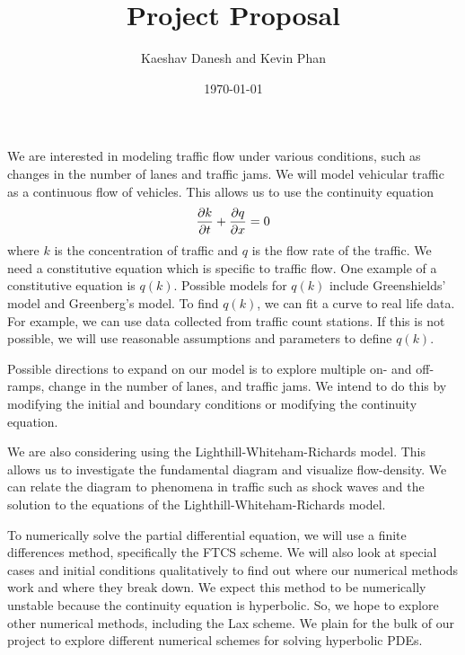 \documentclass[12pt]{article}
\title{Project Proposal}
\author{Kaeshav Danesh and Kevin Phan}
\date{\today}
\begin{document}
	
	\maketitle
    We are interested in modeling traffic flow under various conditions, such as changes in the number of lanes and traffic jams. We will model vehicular traffic as a continuous flow of vehicles. This allows us to use the continuity equation 
    \begin{equation}
        \pdv{k}{t} + \pdv{q}{x} = 0
    \end{equation}
    where $k$ is the concentration of traffic and $q$ is the flow rate of the traffic. We need a constitutive equation which is specific to traffic flow. One example of a constitutive equation is $q(k)$. Possible models for $q(k)$ include Greenshields' model and Greenberg's model. To find $q(k)$, we can fit a curve to real life data. For example, we can use data collected from traffic count stations. If this is not possible, we will use reasonable assumptions and parameters to define $q(k)$. 
    
    Possible directions to expand on our model is to explore multiple on- and off-ramps, change in the number of lanes, and traffic jams. We intend to do this by modifying the initial and boundary conditions or modifying the continuity equation. 
    
    We are also considering using the Lighthill-Whiteham-Richards model. This allows us to investigate the fundamental diagram and visualize flow-density. We can relate the diagram to phenomena in traffic such as shock waves and the solution to the equations of the Lighthill-Whiteham-Richards model.

    To numerically solve the partial differential equation, we will use a finite differences method, specifically the FTCS scheme.  We will also look at special cases and initial conditions qualitatively to find out where our numerical methods work and where they break down. We expect this method to be numerically unstable because the continuity equation is hyperbolic. So, we hope to explore other numerical methods, including the Lax scheme. We plain for the bulk of our project to explore different numerical schemes for solving hyperbolic PDEs.
\end{document}
